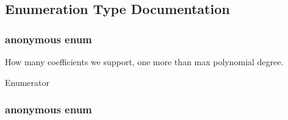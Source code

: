\subsection{Enumeration Type Documentation}
\hypertarget{namespacegomotion_ada59e79a297fc10f2dbc85e4777fa4ae}{\subsubsection[{anonymous enum}]{\setlength{\rightskip}{0pt plus 5cm}anonymous enum}}\label{namespacegomotion_ada59e79a297fc10f2dbc85e4777fa4ae}


How many coefficients we support, one more than max polynomial degree. 

\begin{Desc}
\item[Enumerator]\par
\begin{description}
\item[{\em 
\hypertarget{namespacegomotion_ada59e79a297fc10f2dbc85e4777fa4aea0d345844cda261ed2253d7fc9404e2ef}{C\-O\-E\-F\-F\-\_\-\-M\-A\-X}\label{namespacegomotion_ada59e79a297fc10f2dbc85e4777fa4aea0d345844cda261ed2253d7fc9404e2ef}
}]\end{description}
\end{Desc}
\hypertarget{namespacegomotion_a5b5a03fc09c09e262c6941325f7beb17}{\subsubsection[{anonymous enum}]{\setlength{\rightskip}{0pt plus 5cm}anonymous enum}}\label{namespacegomotion_a5b5a03fc09c09e262c6941325f7beb17}
